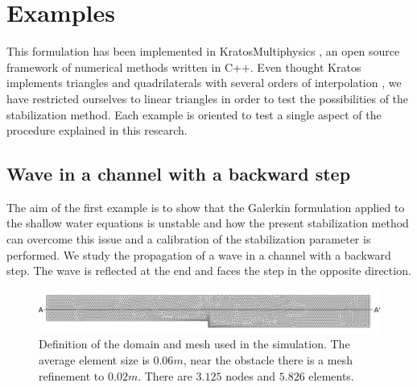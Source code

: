 \documentclass[a4paper,12pt]{article}
\begin{document}
\section{Examples} \label{sec:examples}

This formulation has been implemented in KratosMultiphysics \cite{dadvand2010, dadvand2013}, an open source framework of numerical methods written in C++. Even thought Kratos implements triangles and quadrilaterals with several orders of interpolation \cite{kratos2020}, we have restricted ourselves to linear triangles in order to test the possibilities of the stabilization method. Each example is oriented to test a single aspect of the procedure explained in this research.



\subsection{Wave in a channel with a backward step}

The aim of the first example is to show that the Galerkin formulation applied to the shallow water equations is unstable and how the present stabilization method can overcome this issue and a calibration of the stabilization parameter is performed.
We study the propagation of a wave in a channel with a backward step. The wave is reflected at the end and faces the step in the opposite direction. 

\begin{figure}
    \includegraphics[width=\textwidth]{img/step/mesh.pdf}
    \caption{Definition of the domain and mesh used in the simulation. The average element size is $0.06m$, near the obstacle there is a mesh refinement to $0.02m$. There are $3.125$ nodes and $5.826$ elements.}
    \label{step_mesh}
\end{figure}
\end{document}
